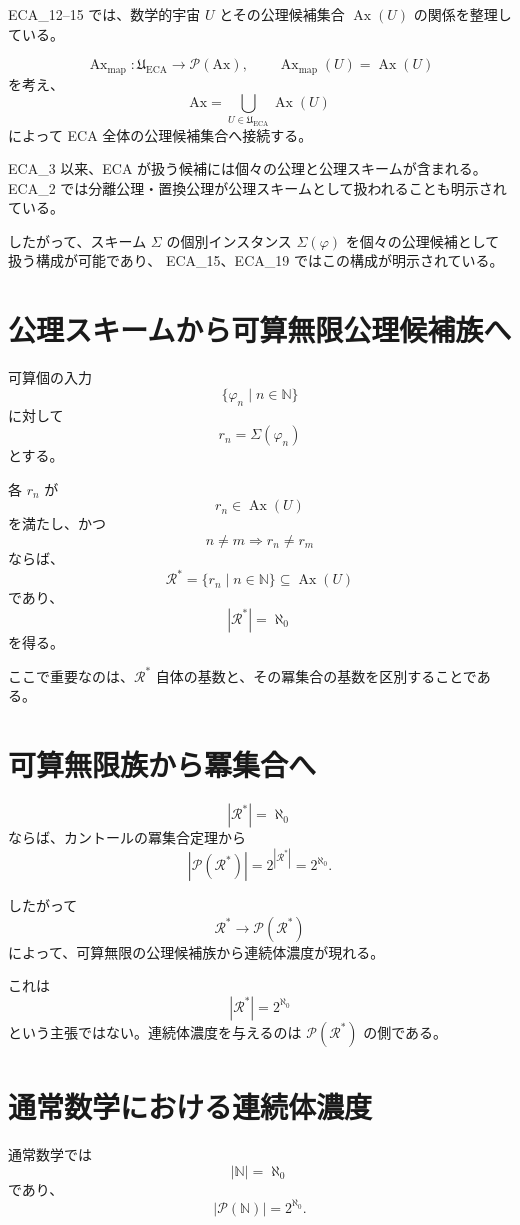 \documentclass[11pt,a4paper]{article}
\newcommand{\Ax}{\mathrm{Ax}}
\newcommand{\Pow}{\mathcal P}
\newcommand{\Rstar}{\mathcal R^*}
\newcommand{\N}{\mathbb N}
\begin{document}
ECA_12--15 では、数学的宇宙 $U$ とその公理候補集合
$\operatorname{Ax}(U)$ の関係を整理している。

\[
\operatorname{Ax}_{\mathrm{map}}:
\mathfrak U_{\mathrm{ECA}}\to\Pow(\Ax),
\qquad
\operatorname{Ax}_{\mathrm{map}}(U)=\operatorname{Ax}(U)
\]
を考え、
\[
\Ax=
\bigcup_{U\in\mathfrak U_{\mathrm{ECA}}}
\operatorname{Ax}(U)
\]
によって ECA 全体の公理候補集合へ接続する。

ECA_3 以来、ECA が扱う候補には個々の公理と公理スキームが含まれる。
ECA_2 では分離公理・置換公理が公理スキームとして扱われることも明示されている。

したがって、スキーム $\Sigma$ の個別インスタンス
$\Sigma(\varphi)$ を個々の公理候補として扱う構成が可能であり、
ECA_15、ECA_19 ではこの構成が明示されている。

\section{公理スキームから可算無限公理候補族へ}

可算個の入力
\[
\{\varphi_n\mid n\in\N\}
\]
に対して
\[
r_n=\Sigma(\varphi_n)
\]
とする。

各 $r_n$ が
\[
r_n\in\operatorname{Ax}(U)
\]
を満たし、かつ
\[
n\neq m\Longrightarrow r_n\neq r_m
\]
ならば、
\[
\Rstar=\{r_n\mid n\in\N\}
\subseteq\operatorname{Ax}(U)
\]
であり、
\[
\boxed{|\Rstar|=\aleph_0}
\]
を得る。

ここで重要なのは、$\Rstar$ 自体の基数と、その冪集合の基数を区別することである。

\section{可算無限族から冪集合へ}

\[
|\Rstar|=\aleph_0
\]
ならば、カントールの冪集合定理から
\[
|\Pow(\Rstar)|
=
2^{|\Rstar|}
=
2^{\aleph_0}.
\]

したがって
\[
\boxed{
\Rstar\longrightarrow\Pow(\Rstar)
}
\]
によって、可算無限の公理候補族から連続体濃度が現れる。

これは
\[
|\Rstar|=2^{\aleph_0}
\]
という主張ではない。連続体濃度を与えるのは
$\Pow(\Rstar)$ の側である。

\section{通常数学における連続体濃度}

通常数学では
\[
|\N|=\aleph_0
\]
であり、
\[
|\Pow(\N)|=2^{\aleph_0}.
\]
\end{document}
